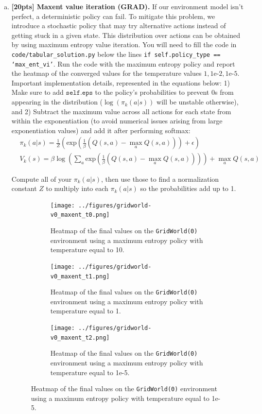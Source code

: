 \documentclass{article}
\begin{document}
\begin{enumerate}[(a)]
\newpage 

\item {\bf [20pts] Maxent value iteration \textbf{(GRAD)}.} If our environment model isn't perfect, a deterministic policy can fail. To mitigate this problem, we introduce a stochastic policy that may try alternative actions instead of getting stuck in a given state. This distribution over actions can be obtained by using maximum entropy value iteration.  You will need to fill the code in \texttt{code/tabular\_solution.py} below the lines \texttt{if self.policy\_type == `max\_ent\_vi'}. Run the code with the maximum entropy policy and report the heatmap of the converged values for the temperature values $1, 1\text{e-}2, 1\text{e-}5$. Important implementation details, represented in the equations below: 1) Make sure to add $\texttt{self.eps}$ to the policy's probabilities to prevent 0s from appearing in the distribution ($\log(\pi_k(a|s))$ will be unstable otherwise), and 2) Subtract the maximum value across all actions for each state from within the exponentiation (to avoid numerical issues arising from large exponentiation values) and add it after performing softmax:
\begin{align*}
    &\pi_k(a|s) = \frac{1}{Z} \left( \text{exp} \left( \frac{1}{\beta}(Q(s, a) - \max_a Q(s, a)) \right) + \epsilon \right) \\
        &V_k(s) = \beta \log \left(\sum_a \text{exp}\left(\frac{1}{\beta}(Q(s, a) - \max_a Q(s, a))\right) \right) + \max_a Q(s, a)
\end{align*}

Compute all of your $\pi_k(a|s)$, then use those to find a normalization constant $Z$ to multiply into each $\pi_k(a|s)$ so the probabilities add up to 1.

\begin{figure}[h!]
    \centering
    \begin{subfigure}{0.3\textwidth}
        \centering
        \texttt{[image: ../figures/gridworld-v0\_maxent\_t0.png]}
        \caption{Heatmap of the final values on the \texttt{GridWorld(0)} environment using a maximum entropy policy with temperature equal to 10.}
    \end{subfigure}
    \hspace{0.1 in}
    \begin{subfigure}{0.3\textwidth}
        \centering
        \texttt{[image: ../figures/gridworld-v0\_maxent\_t1.png]}
        \caption{Heatmap of the final values on the \texttt{GridWorld(0)} environment using a maximum entropy policy with temperature equal to 1.}
    \end{subfigure}
    \hspace{0.1 in}
     \begin{subfigure}{0.3\textwidth}
        \centering
        \texttt{[image: ../figures/gridworld-v0\_maxent\_t2.png]}
        \caption{Heatmap of the final values on the \texttt{GridWorld(0)} environment using a maximum entropy policy with temperature equal to 1e-5.}
    \end{subfigure}
\end{figure}
\vspace{-0.1 in}


\end{enumerate}
\end{document}
